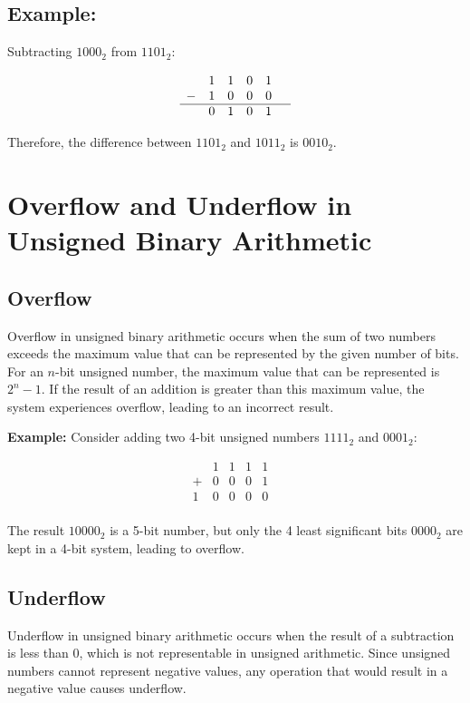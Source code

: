 \documentclass[12pt,openany, tikz,border=10pt]{book}
\begin{document}
\subsection*{Example:}

Subtracting \(1000_2\) from \(1101_2\):

\[
\begin{array}{cccccc}
 & 1 & 1 & 0 & 1 & \\
- & 1 & 0 & 0 & 0 & \\
\hline
 & 0 & 1 & 0 & 1 & \\
\end{array}
\]


Therefore, the difference between $1101_2$ and $1011_2$ is $0010_2$.

\section{\large Overflow and Underflow in Unsigned Binary Arithmetic}

\subsection{Overflow}

Overflow in unsigned binary arithmetic occurs when the sum of two numbers exceeds the maximum value that can be represented by the given number of bits. For an \(n\)-bit unsigned number, the maximum value that can be represented is \(2^n - 1\). If the result of an addition is greater than this maximum value, the system experiences overflow, leading to an incorrect result.

\textbf{Example:} Consider adding two 4-bit unsigned numbers \(1111_2\) and \(0001_2\):

\[
\begin{array}{cccccc}
 & 1 & 1 & 1 & 1 & \\
+ & 0 & 0 & 0 & 1 & \\
\hline
1 & 0 & 0 & 0 & 0 & \\
\end{array}
\]

The result \(10000_2\) is a 5-bit number, but only the 4 least significant bits \(0000_2\) are kept in a 4-bit system, leading to overflow.
\newpage
\subsection{Underflow}

Underflow in unsigned binary arithmetic occurs when the result of a subtraction is less than 0, which is not representable in unsigned arithmetic. Since unsigned numbers cannot represent negative values, any operation that would result in a negative value causes underflow.
\end{document}
